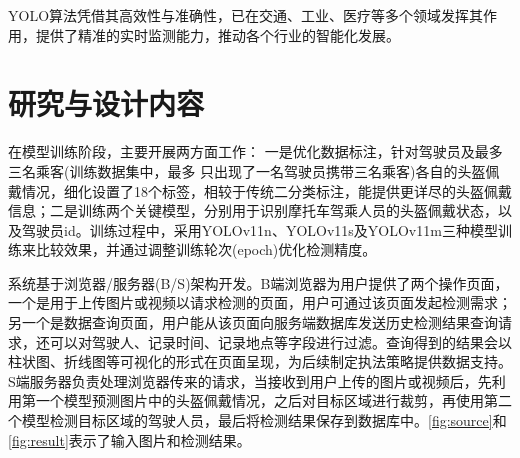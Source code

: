 YOLO算法凭借其高效性与准确性，已在交通、工业、医疗等多个领域发挥其作用，提供了精准的实时监测能力，推动各个行业的智能化发展。

\section{研究与设计内容}

在模型训练阶段，主要开展两方面工作：
一是优化数据标注，针对驾驶员及最多三名乘客(训练数据集中，最多 只出现了一名驾驶员携带三名乘客)各自的头盔佩戴情况，细化设置了18个标签，相较于传统二分类标注，能提供更详尽的头盔佩戴信息；二是训练两个关键模型，分别用于识别摩托车驾乘人员的头盔佩戴状态，以及驾驶员id。训练过程中，采用YOLOv11n、YOLOv11s及YOLOv11m三种模型训练来比较效果，并通过调整训练轮次(epoch)优化检测精度。

系统基于浏览器/服务器(B/S)架构开发。B端浏览器为用户提供了两个操作页面，一个是用于上传图片或视频以请求检测的页面，用户可通过该页面发起检测需求；另一个是数据查询页面，用户能从该页面向服务端数据库发送历史检测结果查询请求，还可以对驾驶人、记录时间、记录地点等字段进行过滤。查询得到的结果会以柱状图、折线图等可视化的形式在页面呈现，为后续制定执法策略提供数据支持。S端服务器负责处理浏览器传来的请求，当接收到用户上传的图片或视频后，先利用第一个模型预测图片中的头盔佩戴情况，之后对目标区域进行裁剪，再使用第二个模型检测目标区域的驾驶人员，最后将检测结果保存到数据库中。\ref{fig:source}和\ref{fig:result}表示了输入图片和检测结果。

